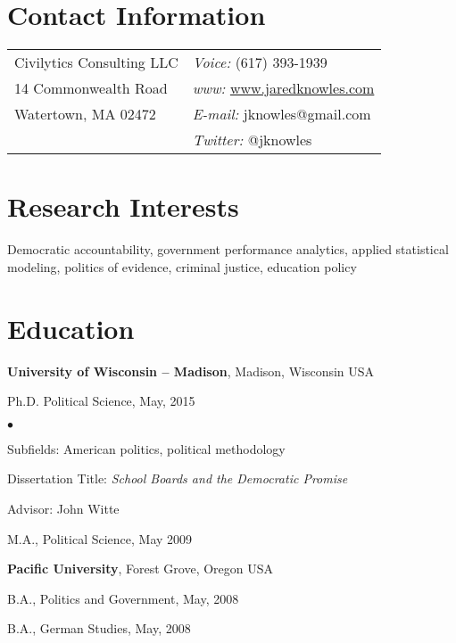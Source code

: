 \documentclass[margin,line]{res}
\newenvironment{list1}{
  \begin{list}{\ding{113}}{%
      \setlength{\itemsep}{0in}
      \setlength{\parsep}{0in} \setlength{\parskip}{0in}
      \setlength{\topsep}{0in} \setlength{\partopsep}{0in} 
      \setlength{\leftmargin}{0.17in}}}{\end{list}}
\newenvironment{list2}{
  \begin{list}{$\bullet$}{%
      \setlength{\itemsep}{0in}
      \setlength{\parsep}{0in} \setlength{\parskip}{0in}
      \setlength{\topsep}{0in} \setlength{\partopsep}{0in} 
      \setlength{\leftmargin}{0.2in}}}{\end{list}}
\begin{document}

\begin{resume}
\section{\sc Contact Information}
\vspace{.05in}
\begin{tabular}{@{}p{2.75in}p{2.75in}}
Civilytics Consulting LLC & {\it Voice:}  (617) 393-1939 \\            
14 Commonwealth Road & {\it www:} \url{www.jaredknowles.com} \\           
Watertown, MA 02472 & {\it E-mail:}  jknowles@gmail.com\\       
 & {\it Twitter:} @jknowles      \\   
\end{tabular}


\section{\sc Research Interests}
Democratic accountability, government performance analytics, applied statistical 
modeling, politics of evidence, criminal justice, education policy


\section{\sc Education}
{\bf University of Wisconsin -- Madison}, Madison, Wisconsin USA\\
\vspace*{-.1in}
\begin{list1}
\item[] Ph.D. Political Science, May, 2015
\begin{list2}
\vspace*{.05in}
\item Subfields: American politics, political methodology
\item Dissertation Title: \emph {School Boards and the Democratic Promise} 
\item Advisor:  John Witte
\end{list2}
\vspace*{.05in}
\item[] M.A., Political Science,  May 2009
\end{list1}

{\bf Pacific University}, Forest Grove, Oregon USA\\
\vspace*{-.1in}
\begin{list1}
\item[] B.A., Politics and Government,  May, 2008
\item[] B.A., German Studies, May, 2008
\end{list1}



\end{resume}
\end{document}
